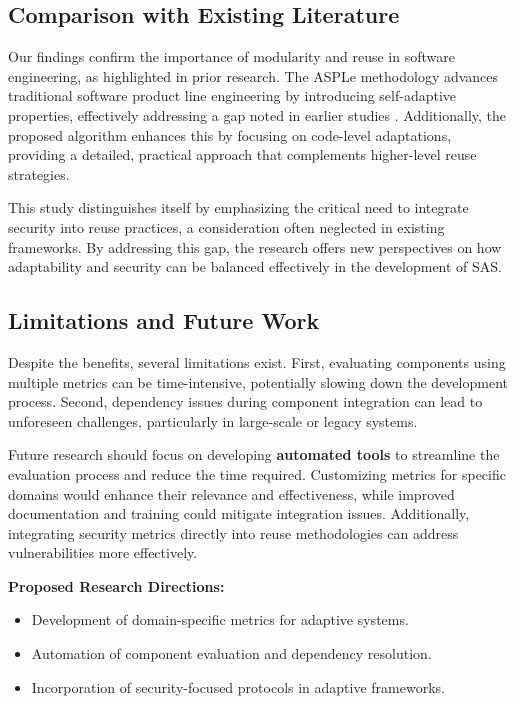 \documentclass[a4paper,10pt]{article}
\begin{document}
\subsection{Comparison with Existing Literature}

Our findings confirm the importance of modularity and reuse in software engineering, as highlighted in prior research. The ASPLe methodology advances traditional software product line engineering by introducing self-adaptive properties, effectively addressing a gap noted in earlier studies \cite{Nadeem2020}. Additionally, the proposed algorithm enhances this by focusing on code-level adaptations, providing a detailed, practical approach that complements higher-level reuse strategies. 

This study distinguishes itself by emphasizing the critical need to integrate security into reuse practices, a consideration often neglected in existing frameworks. By addressing this gap, the research offers new perspectives on how adaptability and security can be balanced effectively in the development of SAS.

\subsection{Limitations and Future Work}

Despite the benefits, several limitations exist. First, evaluating components using multiple metrics can be time-intensive, potentially slowing down the development process. Second, dependency issues during component integration can lead to unforeseen challenges, particularly in large-scale or legacy systems.

Future research should focus on developing \textbf{automated tools} to streamline the evaluation process and reduce the time required. Customizing metrics for specific domains would enhance their relevance and effectiveness, while improved documentation and training could mitigate integration issues. Additionally, integrating security metrics directly into reuse methodologies can address vulnerabilities more effectively.

\textbf{Proposed Research Directions:}
\begin{itemize}
    \item Development of domain-specific metrics for adaptive systems.
    \item Automation of component evaluation and dependency resolution.
    \item Incorporation of security-focused protocols in adaptive frameworks.
\end{itemize}
\end{document}
